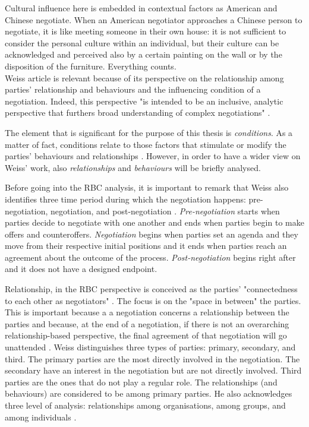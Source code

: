 \documentclass[../main.tex]{subfiles}
\begin{document}
Cultural influence here is embedded in contextual factors as American and Chinese negotiate. When an American negotiator approaches a Chinese person to negotiate, it is like meeting someone in their own house: it is not sufficient to consider the personal culture within an individual, but their culture can be acknowledged and perceived also by a certain painting on the wall or by the disposition of the furniture. Everything counts.\\

Weiss article is relevant because of its perspective on the relationship among parties' relationship and behaviours and the influencing condition of a negotiation. Indeed, this perspective "is intended to be an inclusive, analytic perspective that furthers broad understanding of complex negotiations" \autocite[275]{weiss}.

The element that is significant for the purpose of this thesis is \textit{conditions}. As a matter of fact, conditions relate to those factors that stimulate or modify the parties' behaviours and relationships \autocite[286]{weiss}. However, in order to have a wider view on Weiss' work, also \textit{relationships} and \textit{behaviours} will be briefly analysed.

Before going into the RBC analysis, it is important to remark that Weiss also identifies three time period during which the negotiation happens: pre-negotiation, negotiation, and post-negotiation \autocite[289]{weiss}.
\textit{Pre-negotiation} starts when parties decide to negotiate with one another and ends when parties begin to make offers and counteroffers.
\textit{Negotiation} begins when parties set an agenda and they move from their respective initial positions and it ends when parties reach an agreement about the outcome of the process. \textit{Post-negotiation} begins right after and it does not have a designed endpoint.

Relationship, in the RBC perspective is conceived as the parties' "connectedness to each other as negotiators" \autocite[277]{weiss}. The focus is on the "space in between" the parties. This is important because a a negotiation concerns a relationship between the parties and because, at the end of a negotiation, if there is not an overarching relationship-based perspective, the final agreement of that negotiation will go unattended \autocite[277]{weiss}.
Weiss distinguishes three types of parties: primary, secondary, and third. The primary parties are the most directly involved in the negotiation. The secondary have an interest in the negotiation but are not directly involved. Third parties are the ones that do not play a regular role. The relationships (and behaviours) are considered to be among primary parties.
He also acknowledges three level of analysis: relationships among organisations, among groups, and among individuals \autocite[278]{weiss}.
\end{document}
